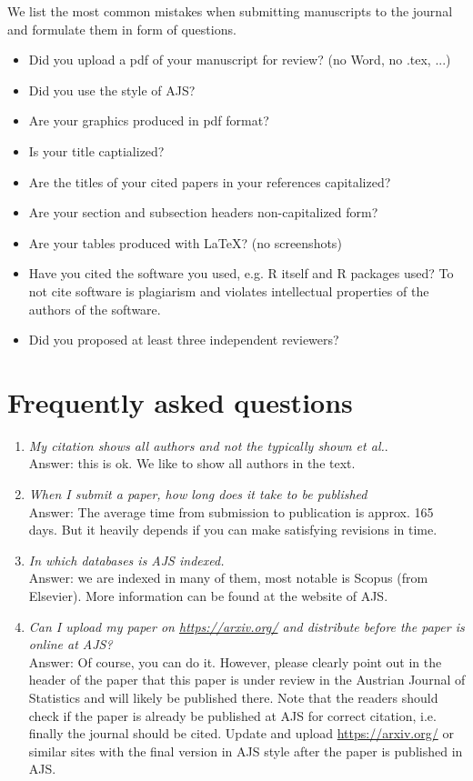 \documentclass[article]{ajs}
\begin{document}
We list the most common mistakes when submitting manuscripts to the journal and formulate them in form of questions.

\begin{itemize}
\item Did you upload a pdf of your manuscript for review? (no Word, no .tex, ...)
\item Did you use the style of AJS?  
\item Are your graphics produced in pdf format? 
\item Is your title captialized?
\item Are the titles of your cited papers in your references capitalized?
\item Are your section and subsection headers non-capitalized form?
\item Are your tables produced with \LaTeX ? (no screenshots)
\item Have you cited the software you used, e.g. R itself and R packages used? To not cite software is plagiarism and violates intellectual properties of the authors of the software.
\item Did you proposed at least three independent reviewers?
\end{itemize}

\section{Frequently asked questions}

\noindent 
\begin{enumerate}
\item \textit{My citation shows all authors and not the typically shown et al.}. \\ Answer: this is ok. We like to show all authors in the text.
\item \textit{When I submit a paper, how long does it take to be published} \\ Answer: The average time from submission to publication is approx. 165 days. But it heavily depends if you can make satisfying revisions in time. 
\item \textit{In which databases is AJS indexed.} \\
Answer: we are indexed in many of them, most notable is Scopus (from Elsevier). More information can be found at the website of AJS. 
\item \textit{Can I upload my paper on \href{https://arxiv.org/}{https://arxiv.org/} and distribute before the paper is online at AJS? } \\
Answer: Of course, you can do it. However, please clearly point out in the header of the paper that this paper is under review in the Austrian Journal of Statistics and will likely be published there. Note that the readers should check if the paper is already be published at AJS for correct citation, i.e. finally the journal should be cited. Update and upload  \href{https://arxiv.org/}{https://arxiv.org/} or similar sites with the final version in AJS style after the paper is published  in AJS. 

\end{enumerate}



%

\end{document}
